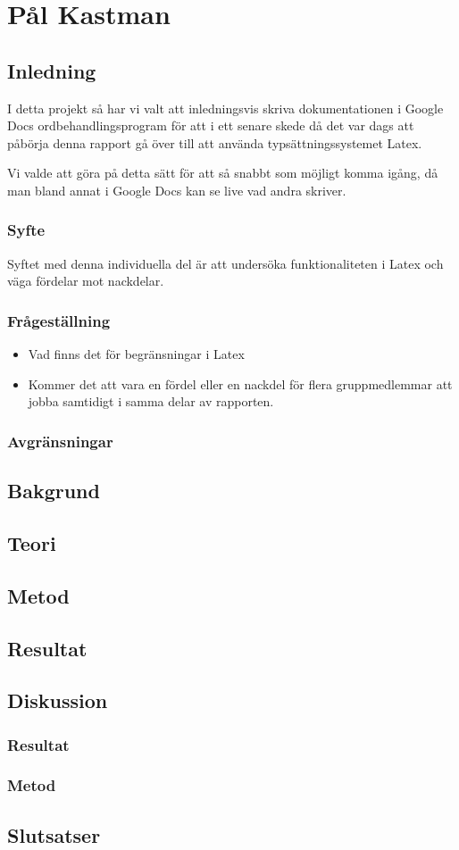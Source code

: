 \section{Pål Kastman}
\subsection{Inledning}
I detta projekt så har vi valt att inledningsvis skriva dokumentationen i Google Docs ordbehandlingsprogram för att 
i ett senare skede då det var dags att påbörja denna rapport gå över till att använda typsättningssystemet Latex. 

Vi valde att göra på detta sätt för att så snabbt som möjligt komma igång, då man bland annat i Google Docs kan se live vad andra skriver.
\subsubsection{Syfte}
Syftet med denna individuella del är att undersöka funktionaliteten i Latex och väga fördelar mot nackdelar.
\subsubsection{Frågeställning}
\begin{itemize}
\item Vad finns det för begränsningar i Latex
\item Kommer det att vara en fördel eller en nackdel för flera gruppmedlemmar att jobba samtidigt i samma delar av rapporten.
\end{itemize}
\subsubsection{Avgränsningar}
\subsection{Bakgrund}
\subsection{Teori}
\subsection{Metod}
\subsection{Resultat}
\subsection{Diskussion}
\subsubsection{Resultat}
\subsubsection{Metod}
\subsection{Slutsatser}
